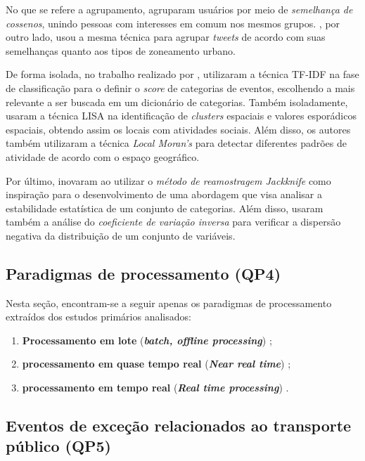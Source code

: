 \documentclass[
	12pt,				%
	oneside,			%
	a4paper,			%
	english,			%
	brazil				%
	]{abntex2ppgsi}
\begin{document}
{{{No que se refere a agrupamento, \cite{Yousaf2014} agruparam usuários por meio de \textit{semelhança de cossenos}, unindo pessoas com interesses em comum nos mesmos grupos. \cite{Frias-Martinez2014}, por outro lado, usou a mesma técnica para agrupar \textit{tweets} de acordo com suas semelhanças quanto aos tipos de zoneamento urbano.

De forma isolada, no trabalho realizado por \cite{Mukherjee2015}, utilizaram a técnica TF-IDF na fase de classificação para o definir o \textit{score} de categorias de eventos, escolhendo a mais relevante a ser buscada em um dicionário de categorias. Também isoladamente, \cite{Steiger2015Census} usaram a técnica LISA na identificação de \textit{clusters} espaciais e valores esporádicos espaciais, obtendo assim os locais com atividades sociais. Além disso, os autores também utilizaram a técnica \textit{Local Moran's} para detectar diferentes padrões de atividade de acordo com o espaço geográfico.

Por último, \cite{Bendler2014} inovaram ao utilizar o \textit{método de reamostragem Jackknife} como inspiração para o desenvolvimento de uma abordagem que visa analisar a estabilidade estatística de um conjunto de categorias. Além disso, usaram também a análise do \textit{coeficiente de variação inversa} para verificar a dispersão negativa da distribuição de um conjunto de variáveis. 

\subsection{Paradigmas de processamento (QP4)}
Nesta seção, encontram-se a seguir apenas os paradigmas de processamento extraídos dos estudos primários analisados: 
\begin{enumerate}
\item \textbf{Processamento em lote} (\textit{\textbf{batch, offline processing}}) \cite{Anantharam2015, Wen2016, Farseev2015, Gutev2016, Mata2015, Chen2016, Abbasi2015, Bendler2014, Yousaf2014, Frias-Martinez2014, Steiger2015Census, Gal-Tzur2014, Gkiotsalitis2016, DiLorenzo2013, Itoh2016, Chaniotakis2015};
\item \textbf{processamento em quase tempo real} (\textit{\textbf{Near real time}}) \cite{Mukherjee2015};
\item \textbf{processamento em tempo real} (\textit{\textbf{Real time processing}}) \cite{Soomro2016, Lecue2014}.
\end{enumerate}

\subsection{Eventos de exceção relacionados ao transporte público (QP5)}
\label{qp5}

}}}
\end{document}

